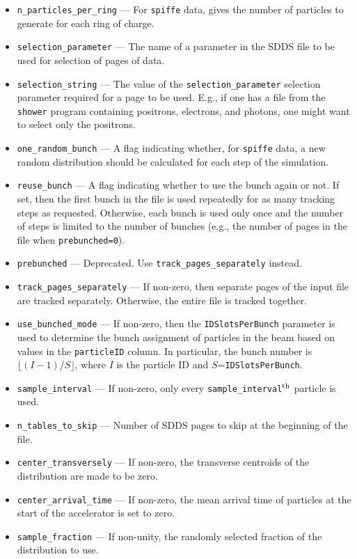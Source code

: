 \documentclass[11pt]{article}
\begin{document}
\begin{itemize}
\item \verb|n_particles_per_ring| --- For {\tt spiffe} data, gives the number of particles to
generate for each ring of charge.
\item \verb|selection_parameter| --- The name of a parameter in the SDDS file to be used for selection
of pages of data.
\item \verb|selection_string| --- The value of the
\verb|selection_parameter| selection parameter required for a page to
be used.  E.g., if one has a file from the {\tt shower} program
containing positrons, electrons, and photons, one might want to select
only the positrons.
\item \verb|one_random_bunch| --- A flag indicating whether, for {\tt spiffe} data, a new random
distribution should be calculated for each step of the simulation.
\item \verb|reuse_bunch| --- A flag indicating whether to use the bunch again or not.  If set, then the first bunch in the
file is used repeatedly for as many tracking steps as requested.  Otherwise, each bunch is used only once and the number of
steps is limited to the number of bunches (e.g., the number of pages in the file when \verb|prebunched=0|).
\item \verb|prebunched| --- Deprecated. Use \verb|track_pages_separately| instead.
\item \verb|track_pages_separately| --- If non-zero, then separate pages of the input file are tracked separately. Otherwise, the 
  entire file is tracked together.
\item \verb|use_bunched_mode| --- If non-zero, then the \verb|IDSlotsPerBunch| parameter is used to determine the bunch assignment of
  particles in the beam based on values in the \verb|particleID| column. In particular, the bunch number is $\lfloor (I-1)/S \rfloor$, where
  $I$ is the particle ID and $S$=\verb|IDSlotsPerBunch|.
\item \verb|sample_interval| --- If non-zero, only every \verb|sample_interval|$^{\rm th}$ particle is used.
\item \verb|n_tables_to_skip| --- Number of SDDS pages to skip at the beginning of the file.
\item \verb|center_transversely| --- If non-zero, the transverse centroids of the distribution are made to be zero.
\item \verb|center_arrival_time| --- If non-zero, the mean arrival time of particles at the start of the
accelerator is set to zero.
\item \verb|sample_fraction| --- If non-unity, the randomly selected fraction of the distribution to use.

\end{itemize}
\end{document}
